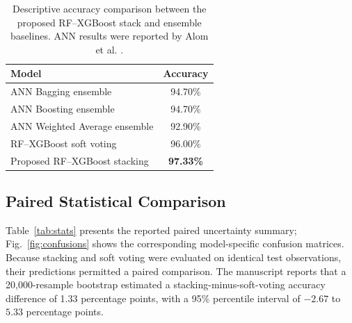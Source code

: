 \documentclass[a4paper,fleqn]{cas-dc}
\begin{document}
\begin{table}[width=\columnwidth,pos=!tbp]
\centering
\caption{Descriptive accuracy comparison between the proposed RF--XGBoost stack and ensemble baselines. ANN results were reported by Alom et al. \cite{alom2024}.}
\label{tab:basecomparison}
\small
\begin{tabularx}{0.74\linewidth}{@{}X c@{}}
\toprule
Model & Accuracy \\
\midrule
ANN Bagging ensemble & 94.70\% \\
ANN Boosting ensemble & 94.70\% \\
ANN Weighted Average ensemble & 92.90\% \\
RF--XGBoost soft voting & 96.00\% \\
Proposed RF--XGBoost stacking & \textbf{97.33\%} \\
\bottomrule
\end{tabularx}
\end{table}

\subsection{Paired Statistical Comparison}
\label{sec:paired}
Table~\ref{tab:stats} presents the reported paired uncertainty summary; Fig.~\ref{fig:confusions} shows the corresponding model-specific confusion matrices. Because stacking and soft voting were evaluated on identical test observations, their predictions permitted a paired comparison. The manuscript reports that a 20,000-resample bootstrap estimated a stacking-minus-soft-voting accuracy difference of 1.33 percentage points, with a 95\% percentile interval of $-2.67$ to $5.33$ percentage points. 
\end{document}
